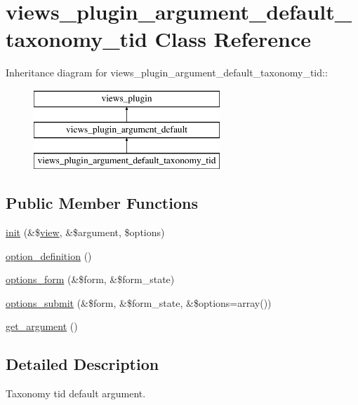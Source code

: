 \hypertarget{classviews__plugin__argument__default__taxonomy__tid}{
\section{views\_\-plugin\_\-argument\_\-default\_\-taxonomy\_\-tid Class Reference}
\label{classviews__plugin__argument__default__taxonomy__tid}
}
Inheritance diagram for views\_\-plugin\_\-argument\_\-default\_\-taxonomy\_\-tid::\begin{figure}[H]
\begin{center}
\leavevmode
\includegraphics[height=3cm]{classviews__plugin__argument__default__taxonomy__tid}
\end{center}
\end{figure}
\subsection*{Public Member Functions}
\begin{DoxyCompactItemize}
\item 
\hyperlink{classviews__plugin__argument__default__taxonomy__tid_a944b41dc55d61139357d7b343d0a185e}{init} (\&\$\hyperlink{classview}{view}, \&\$argument, \$options)
\item 
\hyperlink{classviews__plugin__argument__default__taxonomy__tid_acabe57c2f1f0dffd6775cc339bfb9d7e}{option\_\-definition} ()
\item 
\hyperlink{classviews__plugin__argument__default__taxonomy__tid_a4039b38be3fb7c9702548abaae587b74}{options\_\-form} (\&\$form, \&\$form\_\-state)
\item 
\hyperlink{classviews__plugin__argument__default__taxonomy__tid_a0bcf86a34e2d3a8600022b07c661ce05}{options\_\-submit} (\&\$form, \&\$form\_\-state, \&\$options=array())
\item 
\hyperlink{classviews__plugin__argument__default__taxonomy__tid_a60700fa190086256f0fe26034320faff}{get\_\-argument} ()
\end{DoxyCompactItemize}


\subsection{Detailed Description}
Taxonomy tid default argument. 


